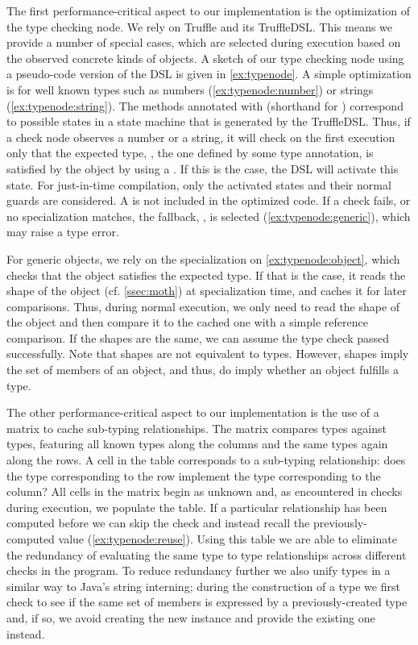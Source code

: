 The first performance-critical aspect to our implementation
is the optimization of the type checking node.
We rely on Truffle and its TruffleDSL\citep{humer2014domainspecific}.
This means we provide a number of special cases,
which are selected during execution based on the observed concrete 
kinds of objects.
A sketch of our type checking node using a pseudo-code version of the DSL
is given in \cref{ex:typenode}.
A simple optimization is for well known types such as
numbers (\cref{ex:typenode:number}) or strings (\cref{ex:typenode:string}).
The methods annotated with  (shorthand for )
correspond to possible states in a state machine that is generated by the
TruffleDSL.
Thus, if a check node observes a number or a string,
it will check on the first execution only that the expected type,
\ie, the one defined by some type annotation,
is satisfied by the object by using a .
If this is the case, the DSL will activate this state.
For just-in-time compilation, only the activated states and their normal guards are considered.
A  is not included in the optimized code.
If a check fails, or no specialization matches, the fallback,
\ie,  is selected (\cref{ex:typenode:generic}),
which may raise a type error.

For generic objects, we rely on the specialization on \cref{ex:typenode:object},
which checks that the object satisfies the expected type.
If that is the case, it reads the shape of the object (cf. \cref{ssec:moth}) at specialization time,
and caches it for later comparisons.
Thus, during normal execution,
we only need to read the shape of the object and then compare it to the cached one
with a simple reference comparison.
If the shapes are the same, we can assume the type check passed successfully.
Note that shapes are not equivalent to types.
However, shapes imply the set of members of an object, and thus,
do imply whether an object fulfills a type.

The other performance-critical aspect to our implementation
is the use of a matrix to cache sub-typing relationships.
The matrix compares types against types,
featuring all known types along the columns and the same types again along the rows.
A cell in the table corresponds to a sub-typing relationship:
does the type corresponding to the row implement
the type corresponding to the column?
All cells in the matrix begin as unknown and, as
encountered in checks during execution, we populate the table.
If a particular relationship has been computed before
we can skip the check and instead recall the previously-computed value
(\cref{ex:typenode:reuse}).
Using this table we are able to eliminate the redundancy of evaluating
the same type to type relationships across different checks in the program. To reduce redundancy further we also unify types in a similar way to Java's string interning; 
during the construction of a type we first check to see if the same
set of members is expressed by a previously-created type and, if so,
we avoid creating the new instance and provide the existing one instead.


